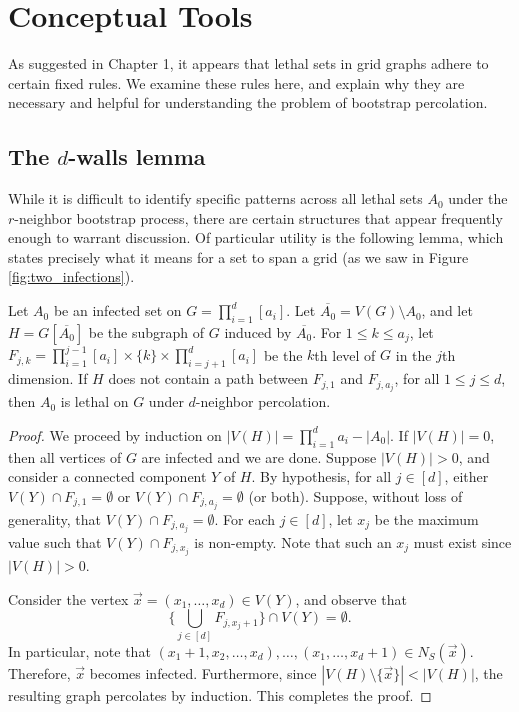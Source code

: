\chapter{Conceptual Tools}

As suggested in Chapter 1, it appears that lethal sets in grid graphs adhere to certain fixed rules. We examine these rules here, and explain why they are necessary and helpful for understanding the problem of bootstrap percolation.

\section{The $d$-walls lemma}

While it is difficult to identify specific patterns across all lethal sets $A_0$ under the $r$-neighbor bootstrap process, there are certain structures that appear frequently enough to warrant discussion. Of particular utility is the following lemma, which states precisely what it means for a set to span a grid (as we saw in Figure \ref{fig:two_infections}).

\begin{lem}
\label{lem:walls}
Let $A_0$ be an infected set on $G = \prod_{i=1}^d [a_i]$. Let $\overline{A_0} = V(G) \setminus A_0$, and let $H = G[\overline{A_0}]$ be the subgraph of $G$ induced by $\overline{A_0}$. For $1 \leq k \leq a_j$, let $F_{j,k} = \prod_{i=1}^{j-1} [a_i] \times \{k\} \times \prod_{i=j+1}^{d} [a_i]$ be the $k$th level of $G$ in the $j$th dimension. If $H$ does not contain a path between $F_{j,1}$ and $F_{j,a_j}$, for all $1 \leq j \leq d$, then $A_0$ is lethal on $G$ under $d$-neighbor percolation.
\end{lem}

\begin{proof}
We proceed by induction on $|V(H)| = \prod_{i=1}^d a_i - |A_0|$. If $|V(H)| = 0$, then all vertices of $G$ are infected and we are done. Suppose $|V(H)| > 0$, and consider a connected component $Y$ of $H$. By hypothesis, for all $j \in [d]$, either $V(Y) \cap F_{j,1} = \emptyset$ or $V(Y) \cap F_{j,a_j} = \emptyset$ (or both). Suppose, without loss of generality, that $V(Y) \cap F_{j,a_j} = \emptyset$.
For each $j \in [d]$, let $x_j$ be the maximum value such that $V(Y) \cap F_{j,x_j}$ is non-empty. Note that such an $x_j$ must exist since $|V(H)| > 0$. 

Consider the vertex $\vec{x} = (x_1, \dots, x_d) \in V(Y)$, and observe that 
$$\{\bigcup_{j \in [d]} F_{j,x_j+1}\} \cap  V(Y) = \emptyset.$$
In particular, note that $(x_1+1, x_2, \dots, x_d), \dots, (x_1, \dots, x_d+1) \in N_S(\vec{x})$. Therefore, $\vec{x}$ becomes infected. Furthermore, since $|V(H) \setminus \{\vec{x}\}| < |V(H)|$, the resulting graph percolates by induction. This completes the proof.
\end{proof}

